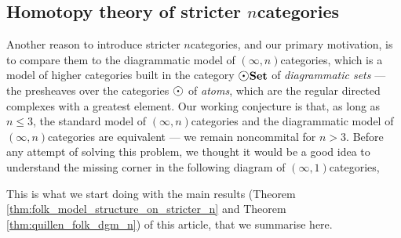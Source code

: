 \subsection*{Homotopy theory of stricter \( n \)\nbd categories}

Another reason to introduce stricter \( n \)\nbd categories, and our primary motivation, is to compare them to the diagrammatic model of \( (\infty, n) \)\nbd categories, which is a model of higher categories \cite{chanavat2024htpy,chanavat2024model} built in the category \( \dgmSet \) of \emph{diagrammatic sets} --- the presheaves over the categories \( \atom \) of \emph{atoms}, which are the regular directed complexes with a greatest element.  
Our working conjecture is that, as long as \( n \le 3 \), the standard model of \( (\infty, n) \)\nbd categories \cite{barwick2020unicity} and the diagrammatic model of \( (\infty, n) \)\nbd categories are equivalent --- we remain noncommital for \( n > 3 \).
Before any attempt of solving this problem, we thought it would be a good idea to understand the missing corner in the following diagram of \( (\infty, 1) \)\nbd categories,
\begin{center}
\end{center}
This is what we start doing with the main results (Theorem \ref{thm:folk_model_structure_on_stricter_n} and Theorem \ref{thm:quillen_folk_dgm_n}) of this article, that we summarise here.
